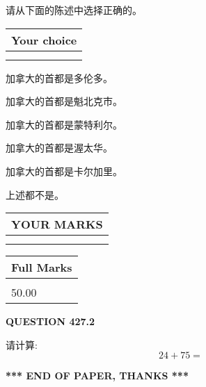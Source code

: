 \documentclass{ctexart}
\begin{document}
  
请从下面的陈述中选择正确的。
  
  
\noindent\hspace{3.0in} \begin{tabular}{|l|}
\hline
Your choice \\
\hline
 \\ 
 \\ 
\hline
\end{tabular}
  
  
 
 
加拿大的首都是多伦多。
 
 
加拿大的首都是魁北克市。
 
 
加拿大的首都是蒙特利尔。
 
 
加拿大的首都是渥太华。
 
 
加拿大的首都是卡尔加里。
 
 
 上述都不是。
 
 
  
\vspace{0.2in}
  
\noindent\begin{tabular}{|l|}
\hline
 YOUR MARKS  \\
\hline
 \\ 
 \\ 
\hline
\end{tabular}
\hspace{0.05in} \begin{tabular}{|l|}
\hline
 Full Marks  \\
\hline
 \\ 
50.00 \\
\hline
\end{tabular}
{\textbf{\Large{QUESTION
427.2 
}}}
  
  
 
请计算:
\begin{equation}
24 +  %
75 = \nonumber
\end{equation}
 

 

 
   
   
 \vspace{0.2in}
 
   
   
   
   
\vspace{1.0in} 
{\textbf{\large{ *** END OF PAPER, THANKS *** }}} 
   
\end{document}
